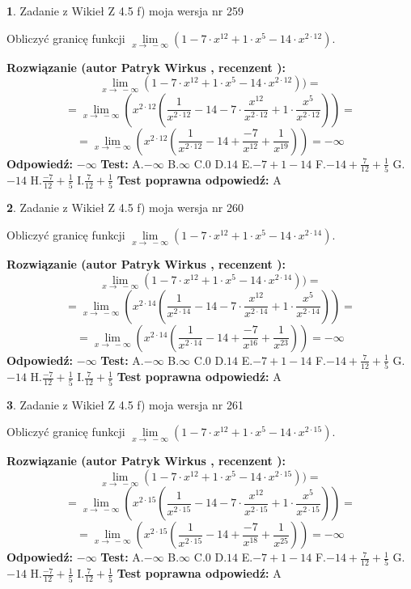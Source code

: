 \documentclass[12pt, a4paper]{article}
\theoremstyle{definition} %
\newtheorem{zad}{}
\newcommand{\zadStart}[1]{\begin{zad}#1\newline}
\newcommand{\zadStop}{\end{zad}}
\newcommand{\rozwStart}[2]{\noindent \textbf{Rozwiązanie (autor #1 , recenzent #2): }\newline}
\newcommand{\rozwStop}{\newline}
\newcommand{\odpStart}{\noindent \textbf{Odpowiedź:}\newline}
\newcommand{\odpStop}{\newline}
\newcommand{\testStart}{\noindent \textbf{Test:}\newline}
\newcommand{\testStop}{\newline}
\newcommand{\kluczStart}{\noindent \textbf{Test poprawna odpowiedź:}\newline}
\newcommand{\kluczStop}{\newline}
\begin{document}
\zadStart{Zadanie z Wikieł Z 4.5 f) moja wersja nr 259}



Obliczyć granicę funkcji  $\lim\limits_{x\to\ -\infty}(1 - 7 \cdot x^{12}+1 \cdot x^{5}- 14 \cdot x^{2\cdot12})$.
\zadStop
\rozwStart{Patryk Wirkus}{}
$$\lim\limits_{x\to\ -\infty}(1 - 7 \cdot x^{12}+1 \cdot x^{5}- 14 \cdot x^{2\cdot12}))=$$
$$=\lim\limits_{x\to\ -\infty}(x^{2\cdot12}(\frac{1}{x^{2\cdot12}}-14 -7 \cdot \frac{x^{12}}{x^{2\cdot12}}+1 \cdot \frac{x^{5}}{x^{2\cdot12}}))=$$
$$=\lim\limits_{x\to\ -\infty}(x^{2\cdot12}(\frac{1}{x^{2\cdot12}}-14 + \frac{-7}{x^{12}}+ \frac{1}{x^{19}}))=-\infty$$
\rozwStop
\odpStart
$-\infty$
\odpStop
\testStart
A.$-\infty$ B.$\infty$ C.$0$ D.$14$ E.$-7 + 1 - 14$
F.$-14+\frac{7}{12}+\frac{1}{5}$ G.$-14$
H.$\frac{-7}{12}+\frac{1}{5}$
I.$\frac{7}{12}+\frac{1}{5}$
\testStop
\kluczStart
A
\kluczStop



\zadStart{Zadanie z Wikieł Z 4.5 f) moja wersja nr 260}



Obliczyć granicę funkcji  $\lim\limits_{x\to\ -\infty}(1 - 7 \cdot x^{12}+1 \cdot x^{5}- 14 \cdot x^{2\cdot14})$.
\zadStop
\rozwStart{Patryk Wirkus}{}
$$\lim\limits_{x\to\ -\infty}(1 - 7 \cdot x^{12}+1 \cdot x^{5}- 14 \cdot x^{2\cdot14}))=$$
$$=\lim\limits_{x\to\ -\infty}(x^{2\cdot14}(\frac{1}{x^{2\cdot14}}-14 -7 \cdot \frac{x^{12}}{x^{2\cdot14}}+1 \cdot \frac{x^{5}}{x^{2\cdot14}}))=$$
$$=\lim\limits_{x\to\ -\infty}(x^{2\cdot14}(\frac{1}{x^{2\cdot14}}-14 + \frac{-7}{x^{16}}+ \frac{1}{x^{23}}))=-\infty$$
\rozwStop
\odpStart
$-\infty$
\odpStop
\testStart
A.$-\infty$ B.$\infty$ C.$0$ D.$14$ E.$-7 + 1 - 14$
F.$-14+\frac{7}{12}+\frac{1}{5}$ G.$-14$
H.$\frac{-7}{12}+\frac{1}{5}$
I.$\frac{7}{12}+\frac{1}{5}$
\testStop
\kluczStart
A
\kluczStop



\zadStart{Zadanie z Wikieł Z 4.5 f) moja wersja nr 261}



Obliczyć granicę funkcji  $\lim\limits_{x\to\ -\infty}(1 - 7 \cdot x^{12}+1 \cdot x^{5}- 14 \cdot x^{2\cdot15})$.
\zadStop
\rozwStart{Patryk Wirkus}{}
$$\lim\limits_{x\to\ -\infty}(1 - 7 \cdot x^{12}+1 \cdot x^{5}- 14 \cdot x^{2\cdot15}))=$$
$$=\lim\limits_{x\to\ -\infty}(x^{2\cdot15}(\frac{1}{x^{2\cdot15}}-14 -7 \cdot \frac{x^{12}}{x^{2\cdot15}}+1 \cdot \frac{x^{5}}{x^{2\cdot15}}))=$$
$$=\lim\limits_{x\to\ -\infty}(x^{2\cdot15}(\frac{1}{x^{2\cdot15}}-14 + \frac{-7}{x^{18}}+ \frac{1}{x^{25}}))=-\infty$$
\rozwStop
\odpStart
$-\infty$
\odpStop
\testStart
A.$-\infty$ B.$\infty$ C.$0$ D.$14$ E.$-7 + 1 - 14$
F.$-14+\frac{7}{12}+\frac{1}{5}$ G.$-14$
H.$\frac{-7}{12}+\frac{1}{5}$
I.$\frac{7}{12}+\frac{1}{5}$
\testStop
\kluczStart
A
\kluczStop
\end{document}
